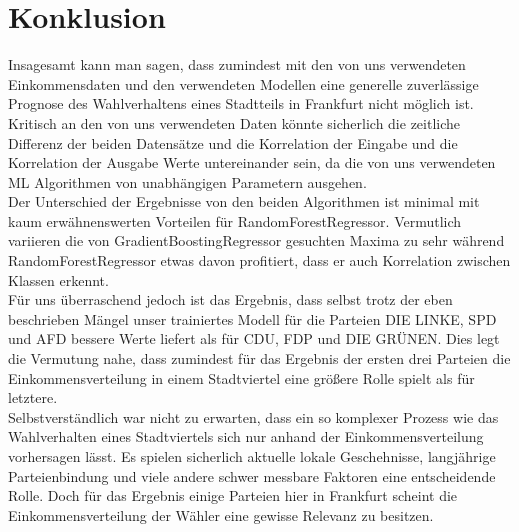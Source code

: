 \documentclass[a4paper,10pt]{scrartcl}
\begin{document}
\section{Konklusion}
Insagesamt kann man sagen, dass zumindest mit den von uns verwendeten Einkommensdaten und den verwendeten Modellen eine generelle zuverlässige Prognose des Wahlverhaltens eines Stadtteils in Frankfurt nicht möglich ist. Kritisch an den von uns verwendeten Daten könnte sicherlich die zeitliche Differenz der beiden Datensätze und die Korrelation der Eingabe und die Korrelation der Ausgabe Werte untereinander sein, da die von uns verwendeten ML Algorithmen von unabhängigen Parametern ausgehen.\\
 Der Unterschied der Ergebnisse von den beiden Algorithmen ist minimal mit kaum erwähnenswerten Vorteilen für RandomForestRegressor. Vermutlich variieren die von GradientBoostingRegressor gesuchten Maxima zu sehr während RandomForestRegressor etwas davon profitiert, dass er auch Korrelation zwischen Klassen erkennt.  \\
 Für uns überraschend jedoch ist das Ergebnis, dass selbst trotz der eben beschrieben Mängel unser trainiertes Modell für die Parteien DIE LINKE, SPD und AFD bessere Werte liefert als für CDU, FDP und DIE GRÜNEN. Dies legt die Vermutung nahe, dass zumindest für das Ergebnis der ersten drei Parteien die Einkommensverteilung in einem Stadtviertel eine größere Rolle spielt als für letztere.\\
Selbstverständlich war nicht zu erwarten, dass ein so komplexer Prozess wie das Wahlverhalten eines Stadtviertels sich nur anhand der Einkommensverteilung vorhersagen lässt. Es spielen sicherlich aktuelle lokale Geschehnisse, langjährige Parteienbindung und viele andere schwer messbare Faktoren eine entscheidende Rolle. Doch für das Ergebnis einige Parteien hier in Frankfurt scheint die Einkommensverteilung der Wähler eine gewisse Relevanz zu besitzen. 
\end{document}
